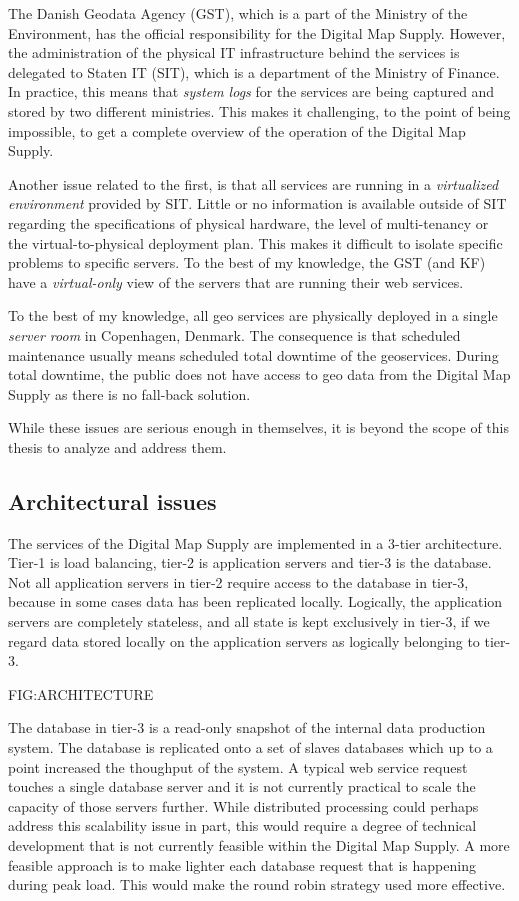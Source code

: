 The Danish Geodata Agency (GST), which is a part of the Ministry of the Environment, has the official responsibility for the Digital Map Supply. However, the administration of the physical IT infrastructure behind the services is delegated to Staten IT (SIT), which is a department of the Ministry of Finance. In practice, this means that \emph{system logs} for the services are being captured and stored by two different ministries. This makes it challenging, to the point of being impossible, to get a complete overview of the operation of the Digital Map Supply.

Another issue related to the first, is that all services are running in a \emph{virtualized environment} provided by SIT. Little or no information is available outside of SIT regarding the specifications of physical hardware, the level of multi-tenancy or the virtual-to-physical deployment plan. This makes it difficult to isolate specific problems to specific servers. To the best of my knowledge, the GST (and KF) have a \emph{virtual-only} view of the servers that are running their web services.

To the best of my knowledge, all geo services are physically deployed in a single \emph{server room} in Copenhagen, Denmark. The consequence is that scheduled maintenance usually means scheduled total downtime of the geoservices. During total downtime, the public does not have access to geo data from the Digital Map Supply as there is no fall-back solution.

While these issues are serious enough in themselves, it is beyond the scope of this thesis to analyze and address them.

\subsection{Architectural issues}
The services of the Digital Map Supply are implemented in a 3-tier architecture. Tier-1 is load balancing, tier-2 is application servers and tier-3 is the database. Not all application servers in tier-2 require access to the database in tier-3, because in some cases data has been replicated locally. Logically, the application servers are completely stateless, and all state is kept exclusively in tier-3, if we regard data stored locally on the application servers as logically belonging to tier-3. 

FIG:ARCHITECTURE

The database in tier-3 is a read-only snapshot of the internal data production system. The database is replicated onto a set of slaves databases which up to a point increased the thoughput of the system. A typical web service request touches a single database server and it is not currently practical to scale the capacity of those servers further. While distributed processing could perhaps address this scalability issue in part, this would require a degree of technical development that is not currently feasible within the Digital Map Supply. A more feasible approach is to make lighter each database request that is happening during peak load. This would make the round robin strategy used more effective.

